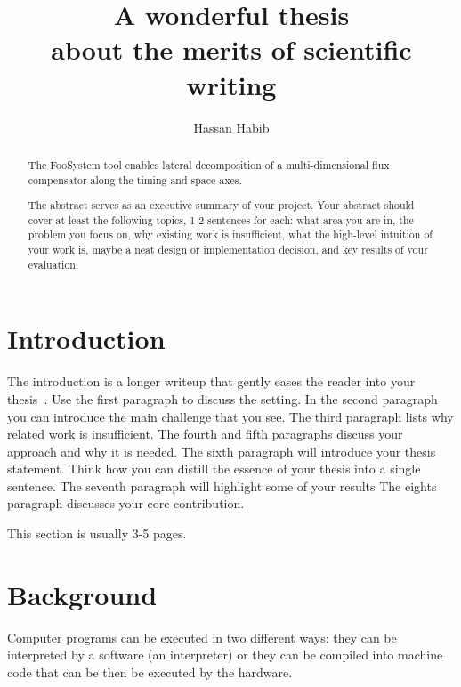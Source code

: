\documentclass[a4paper,11pt,oneside]{report}
\title{A wonderful thesis\\about the merits of scientific writing}
\author{Hassan Habib}
\newcommand{\sysname}{FooSystem\xspace}
\begin{document}
\maketitle
\makededication
\makeacks

\begin{abstract}
The \sysname tool enables lateral decomposition of a multi-dimensional
flux compensator along the timing and space axes.

The abstract serves as an executive summary of your project.
Your abstract should cover at least the following topics, 1-2 sentences for
each: what area you are in, the problem you focus on, why existing work is
insufficient, what the high-level intuition of your work is, maybe a neat
design or implementation decision, and key results of your evaluation.
\end{abstract}


\maketoc

\chapter{Introduction}

The introduction is a longer writeup that gently eases the reader into your
thesis~\cite{dinesh20oakland}. Use the first paragraph to discuss the setting.
In the second paragraph you can introduce the main challenge that you see.
The third paragraph lists why related work is insufficient.
The fourth and fifth paragraphs discuss your approach and why it is needed.
The sixth paragraph will introduce your thesis statement. Think how you can
distill the essence of your thesis into a single sentence.
The seventh paragraph will highlight some of your results
The eights paragraph discusses your core contribution.

This section is usually 3-5 pages.

\chapter{Background}

Computer programs can be executed in two different ways: they can be interpreted
by a software (an interpreter) or they can be compiled into machine code that can
be then be executed by the hardware.
\end{document}
